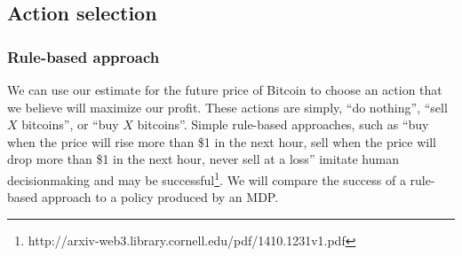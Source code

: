 \documentclass[10pt]{article}
\begin{document}
 
 \subsection*{Action selection}
 
\subsubsection*{Rule-based approach}
 We can use our estimate for the future price of Bitcoin to choose an action that we believe will maximize our profit. These actions are simply, ``do nothing'', ``sell $X$ bitcoins'', or ``buy $X$ bitcoins''. Simple rule-based approaches, such as ``buy when the price will rise more than \$1 in the next hour, sell when the price will drop more than \$1 in the next hour, never sell at a loss'' imitate human decisionmaking and may be successful\footnote{http://arxiv-web3.library.cornell.edu/pdf/1410.1231v1.pdf}.  We will compare the success of a rule-based approach to a policy produced by an MDP.
 	
\end{document}
